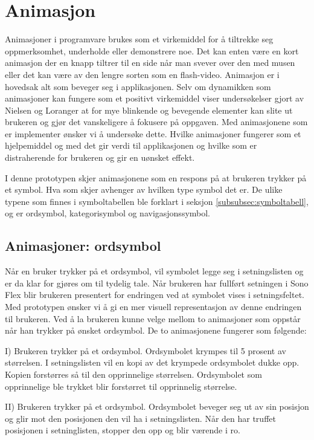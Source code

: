 \section{Animasjon}

Animasjoner i programvare brukes som et virkemiddel for å tiltrekke seg oppmerksomhet, underholde eller demonstrere noe. Det kan enten være en kort animasjon der en knapp tiltrer til en side når man svever over den med musen eller det kan være av den lengre sorten som en flash-video.  Animasjon er i hovedsak alt som beveger seg i applikasjonen. Selv om dynamikken som animasjoner kan fungere som et positivt virkemiddel viser undersøkelser gjort av Nielsen og Loranger \cite{NielsenBok}  at for mye blinkende og bevegende elementer kan slite ut brukeren og gjør det vanskeligere å fokusere på oppgaven. Med animasjonene som er implementer ønsker vi å undersøke dette. Hvilke animasjoner fungerer som et hjelpemiddel og med det gir verdi til applikasjonen og hvilke som er distraherende for brukeren og gir en uønsket effekt.

I denne prototypen skjer animasjonene som en respons på at brukeren trykker på et symbol. Hva som skjer avhenger av hvilken type symbol det er. De ulike typene som finnes i symboltabellen ble forklart i seksjon \ref{subsubsec:symboltabell}, og er ordsymbol, kategorisymbol og navigasjonssymbol.


\subsection{Animasjoner: ordsymbol}

Når en bruker trykker på et ordsymbol, vil symbolet legge seg i setningslisten og er da klar for gjøres om til tydelig tale. Når brukeren har fullført setningen i Sono Flex blir brukeren presentert for endringen ved at symbolet vises i setningsfeltet. Med prototypen ønsker vi  å gi en mer visuell representasjon av denne endringen til brukeren. Ved å la brukeren kunne velge mellom to animasjoner som oppstår når han trykker på ønsket ordsymbol. De to animasjonene fungerer som følgende:


I) Brukeren trykker på et ordsymbol.
   Ordsymbolet krympes til 5 prosent av størrelsen.
   I setningslisten vil en kopi av det krympede ordsymbolet dukke opp.
   Kopien forstørres så til den opprinnelige størrelsen.
   Ordsymbolet som opprinnelige ble trykket blir forstørret til opprinnelig størrelse.

   
II) Brukeren trykker på et ordsymbol.
    Ordsymbolet beveger seg ut av sin posisjon og glir mot den posisjonen den vil ha i setningslisten.
    Når den har truffet posisjonen i setninglisten, stopper den opp og blir værende i ro.

